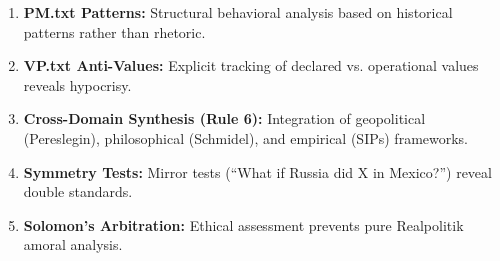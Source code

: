 \documentclass[11pt,a4paper]{article}
\theoremstyle{definition}
\theoremstyle{remark}
\begin{document}
\begin{enumerate}
    \item \textbf{PM.txt Patterns:} Structural behavioral analysis based on historical patterns rather than rhetoric.
    
    \item \textbf{VP.txt Anti-Values:} Explicit tracking of declared vs. operational values reveals hypocrisy.
    
    \item \textbf{Cross-Domain Synthesis (Rule 6):} Integration of geopolitical (Pereslegin), philosophical (Schmidel), and empirical (SIPs) frameworks.
    
    \item \textbf{Symmetry Tests:} Mirror tests (``What if Russia did X in Mexico?'') reveal double standards.
    
    \item \textbf{Solomon's Arbitration:} Ethical assessment prevents pure Realpolitik amoral analysis.
\end{enumerate}
\end{document}
